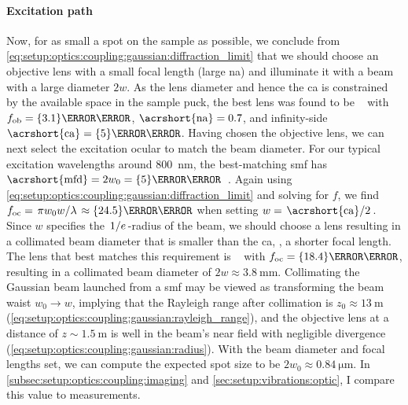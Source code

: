 \paragraph{Excitation path}
Now, for as small a spot on the sample as possible, we conclude from \cref{eq:setup:optics:coupling:gaussian:diffraction_limit} that we should choose an objective lens with a small focal length \fob (large \acrshort{na}) and illuminate it with a beam with a large diameter $2 w$.
As the lens diameter and hence the \acrfull{ca}
is constrained by the available space in the sample puck, the best lens was found to be \objectivelens~\cite{Thorlabs354330} with $\fob = \qty{3.1}{\milli\meter}$, $\mr{\acrshort{na}} = \num{0.7}$, and infinity-side $\mr{\acrshort{ca}} = \qty{5}{\milli\meter}$.
Having chosen the objective lens, we can next select the excitation ocular to match the beam diameter.
For our typical excitation wavelengths around \qty{800}{\nano\meter}, the best-matching \gls{smf} has $\mr{\acrshort{mfd}} = 2 w_0 = \qty{5}{\micro\meter}$~\cite{Thorlabs780HP}.
Again using \cref{eq:setup:optics:coupling:gaussian:diffraction_limit} and solving for $f$, we find $\foc = \flatfrac{\pi w_0 w}{\lambda} \approx \qty{24.5}{\milli\meter}$ when setting $w = \flatfrac{\mr{\acrshort{ca}}}{2}$.
Since $w$ specifies the $\flatfrac{1}{e}$-radius of the beam, we should choose a lens resulting in a collimated beam diameter that is smaller than the \gls{ca}, \ie, a shorter focal length.
The lens that best matches this requirement is \ocularlens~\cite{ThorlabsA280TM} with $\foc = \qty{18.4}{\milli\meter}$, resulting in a collimated beam diameter of $2 w \approx\qty{3.8}{\milli\meter}$.
Collimating the Gaussian beam launched from a \gls{smf} may be viewed as transforming the beam waist $w_0\to w$, implying that the Rayleigh range after collimation is $z_0\approx\qty{13}{\meter}$ (\cref{eq:setup:optics:coupling:gaussian:rayleigh_range}), and the objective lens at a distance of $z\sim\qty{1.5}{\meter}$ is well in the beam's near field with negligible divergence (\cf \cref{eq:setup:optics:coupling:gaussian:radius}).
With the beam diameter and focal lengths set, we can compute the expected spot size to be $2 w_0\approx\qty{0.84}{\micro\meter}$.
In \cref{subsec:setup:optics:coupling:imaging} and \cref{sec:setup:vibrations:optic}, I compare this value to measurements.

